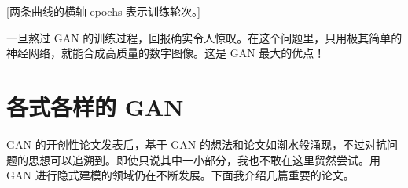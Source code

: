 [两条曲线的横轴 epochs 表示训练轮次。]


一旦熬过 GAN 的训练过程，回报确实令人惊叹。在这个问题里，只用极其简单的神经网络，就能合成高质量的数字图像。这是 GAN 最大的优点！

\section{各式各样的 GAN}
\label{sec:08-04}

GAN 的开创性论文发表后，基于 GAN 的想法和论文如潮水般涌现，不过对抗问题的思想可以追溯到。即使只说其中一小部分，我也不敢在这里贸然尝试。用 GAN 进行隐式建模的领域仍在不断发展。下面我介绍几篇重要的论文。

